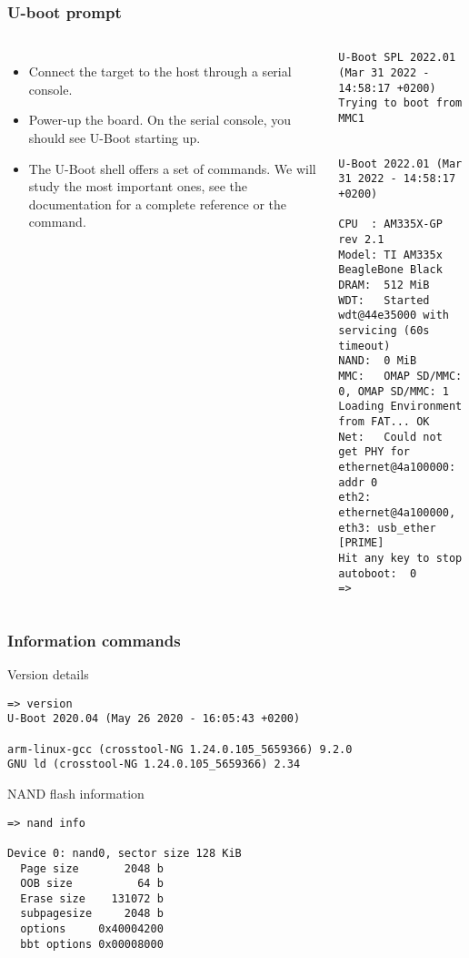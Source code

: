 \begin{frame}[fragile]
  \frametitle{U-boot prompt}
  \begin{columns}
  \begin{itemize}
  \item Connect the target to the host through a serial console.
  \item Power-up the board. On the serial console, you should
	see U-Boot starting up.
  \item The U-Boot shell offers a set of commands. We will study the
    most important ones, see the documentation for a complete
    reference or the  command.
  \end{itemize}
\tiny
\begin{verbatim}
U-Boot SPL 2022.01 (Mar 31 2022 - 14:58:17 +0200)
Trying to boot from MMC1


U-Boot 2022.01 (Mar 31 2022 - 14:58:17 +0200)

CPU  : AM335X-GP rev 2.1
Model: TI AM335x BeagleBone Black
DRAM:  512 MiB
WDT:   Started wdt@44e35000 with servicing (60s timeout)
NAND:  0 MiB
MMC:   OMAP SD/MMC: 0, OMAP SD/MMC: 1
Loading Environment from FAT... OK
Net:   Could not get PHY for ethernet@4a100000: addr 0
eth2: ethernet@4a100000, eth3: usb_ether [PRIME]
Hit any key to stop autoboot:  0
=>
\end{verbatim}
  \end{columns}
\end{frame}

\begin{frame}[fragile]
  \frametitle{Information commands}
\begin{block}{Version details}
{\tiny
\begin{verbatim}
=> version
U-Boot 2020.04 (May 26 2020 - 16:05:43 +0200)

arm-linux-gcc (crosstool-NG 1.24.0.105_5659366) 9.2.0
GNU ld (crosstool-NG 1.24.0.105_5659366) 2.34
\end{verbatim}}
\end{block}

\begin{block}{NAND flash information}
{\tiny
\begin{verbatim}
=> nand info

Device 0: nand0, sector size 128 KiB
  Page size       2048 b
  OOB size          64 b
  Erase size    131072 b
  subpagesize     2048 b
  options     0x40004200
  bbt options 0x00008000
\end{verbatim}}
\end{block}
\end{frame}


